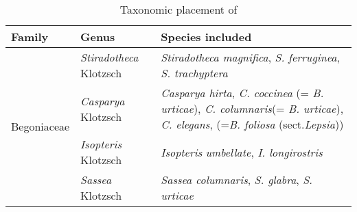 \begin{table}[htbp]
  \centering
  \caption{Taxonomic placement of}
    \begin{tabular}{cll}
    \toprule
    \multicolumn{1}{l}{Family} & Genus & Species included \\
    \midrule
    \multirow{4}[8]{*}{Begoniaceae} & \textit{Stiradotheca} Klotzsch & \textit{Stiradotheca magnifica}, \textit{S. ferruginea}, \textit{S. trachyptera} \\
\cmidrule{2-3}          & \textit{Casparya} Klotzsch & \multicolumn{1}{p{37.355em}}{\textit{Casparya hirta}, \textit{C. coccinea} (= \textit{B. urticae}), \textit{C. columnaris}\newline{}(= \textit{B. urticae}), \textit{C. elegans}, (=\textit{B. foliosa} (sect.\newline{}\textit{Lepsia}))} \\
\cmidrule{2-3}          & \textit{Isopteris} Klotzsch & \textit{Isopteris} \textit{umbellate}, \textit{I. longirostris} \\
\cmidrule{2-3}          & \textit{Sassea} Klotzsch & \textit{Sassea columnaris}, \textit{S. glabra}, \textit{S. urticae} \\
    \bottomrule
    \bottomrule
    \end{tabular}%
  \label{tab:}%
\end{table}%
